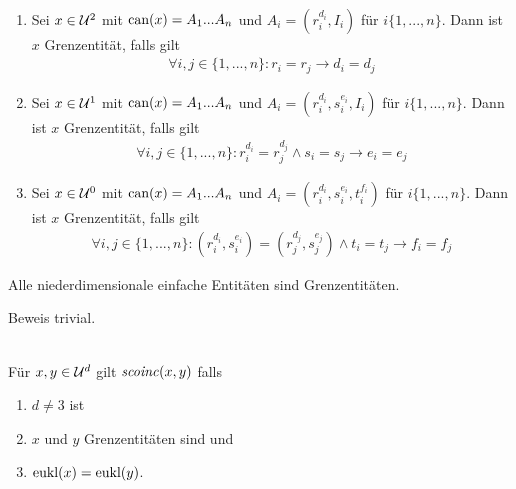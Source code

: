 \begin{dfn}[Grenzentität]\
    \begin{enumerate}
        \item Sei $x \in \mathcal{U}^2$ mit $\text{can}(x) = A_1 ... A_n$ und $A_i = (r_i^{d_i},I_i)$ für $i \{1, ..., n\}$. Dann ist $x$ Grenzentität, falls gilt
            \begin{align*}
                \forall i,j \in \{1, ..., n\}: r_i = r_j \to d_i = d_j
            \end{align*}
        \item Sei $x \in \mathcal{U}^1$ mit $\text{can}(x) = A_1 ... A_n$ und $A_i = (r_i^{d_i},s_i^{e_i},I_i)$ für $i \{1, ..., n\}$. Dann ist $x$ Grenzentität, falls gilt
            \begin{align*}
                \forall i,j \in \{1, ..., n\}: r_i^{d_i} = r_j^{d_j} \land s_i = s_j \to e_i = e_j
            \end{align*}
        \item Sei $x \in \mathcal{U}^0$ mit $\text{can}(x) = A_1 ... A_n$ und $A_i = (r_i^{d_i},s_i^{e_i},t_i^{f_i})$ für $i \{1, ..., n\}$. Dann ist $x$ Grenzentität, falls gilt
            \begin{align*}
                \forall i,j \in \{1, ..., n\}: (r_i^{d_i}, s_i^{e_i}) = (r_j^{d_j},s_j^{e_j}) \land t_i = t_j \to f_i = f_j
            \end{align*}
    \end{enumerate}
\end{dfn}

\begin{satz}\label{satz:einfachgrenze}
    Alle niederdimensionale einfache Entitäten sind Grenzentitäten.
\end{satz}
Beweis trivial.


\begin{dfn}[$\Gscoinc$]\ \\
    Für $x,y \in \mathcal{U}^d$ gilt $\mathit{scoinc}(x,y)$ falls
    \begin{enumerate}
        \item $d \neq 3$ ist
        \item $x$ und $y$ Grenzentitäten sind und
        \item $\text{eukl}(x) = \text{eukl}(y)$.
    \end{enumerate}
\end{dfn}


